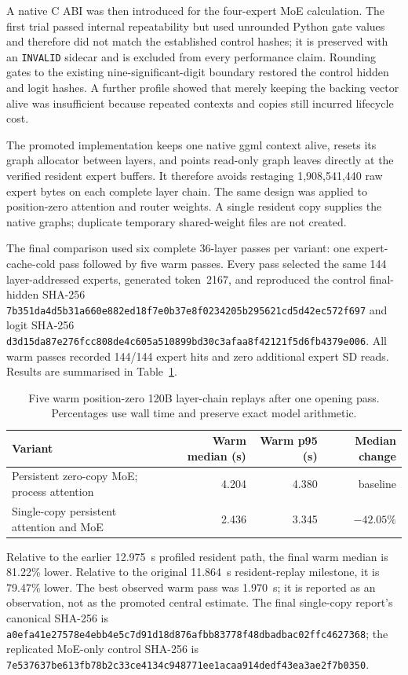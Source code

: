 A native C ABI was then introduced for the four-expert MoE calculation.  The
first trial passed internal repeatability but used unrounded Python gate values
and therefore did not match the established control hashes; it is preserved
with an \texttt{INVALID} sidecar and is excluded from every performance claim.
Rounding gates to the existing nine-significant-digit boundary restored the
control hidden and logit hashes.  A further profile showed that merely keeping
the backing vector alive was insufficient because repeated contexts and copies
still incurred lifecycle cost.

The promoted implementation keeps one native ggml context alive, resets its
graph allocator between layers, and points read-only graph leaves directly at
the verified resident expert buffers.  It therefore avoids restaging
1,908,541,440 raw expert bytes on each complete layer chain.  The same design
was applied to position-zero attention and router weights.  A single resident
copy supplies the native graphs; duplicate temporary shared-weight files are
not created.

The final comparison used six complete 36-layer passes per variant: one
expert-cache-cold pass followed by five warm passes.  Every pass selected the
same 144 layer-addressed experts, generated token~2167, and reproduced the
control final-hidden SHA-256
\texttt{7b351da4d5b31a660e882ed18f7e0b37e8f0234205b295621cd5d42ec572f697}
and logit SHA-256
\texttt{d3d15da87e276fcc808de4c605a510899bd30c3afaa8f42121f5d6fb4379e006}.
All warm passes recorded 144/144 expert hits and zero additional expert SD
reads.  Results are summarised in Table~\ref{tab:gptoss120b-persistent}.

\begin{table}[htbp]
\centering
\begin{tabular}{lrrr}
\toprule
Variant & Warm median (s) & Warm p95 (s) & Median change \\
\midrule
Persistent zero-copy MoE; process attention & 4.204 & 4.380 & baseline \\
Single-copy persistent attention and MoE & 2.436 & 3.345 & $-42.05\%$ \\
\bottomrule
\end{tabular}
\caption{Five warm position-zero 120B layer-chain replays after one opening
pass.  Percentages use wall time and preserve exact model arithmetic.}
\label{tab:gptoss120b-persistent}
\end{table}

Relative to the earlier 12.975~s profiled resident path, the final warm median
is 81.22\% lower.  Relative to the original 11.864~s resident-replay milestone,
it is 79.47\% lower.  The best observed warm pass was 1.970~s; it is reported
as an observation, not as the promoted central estimate.  The final
single-copy report's canonical SHA-256 is
\texttt{a0efa41e27578e4ebb4e5c7d91d18d876afbb83778f48dbadbac02ffc4627368};
the replicated MoE-only control SHA-256 is
\texttt{7e537637be613fb78b2c33ce4134c948771ee1acaa914dedf43ea3ae2f7b0350}.

